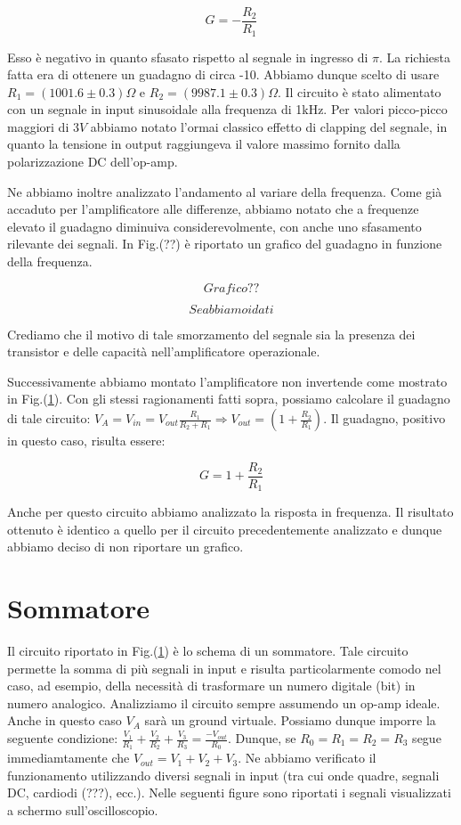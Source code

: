 $$G=-\frac{R_2}{R_1}$$


Esso è negativo in quanto sfasato rispetto al segnale in ingresso di $\pi$.
La richiesta fatta era di ottenere un guadagno di circa -10. Abbiamo dunque scelto di usare $R_1=(1001.6\pm0.3)\Omega$ e $R_2=(9987.1\pm0.3)\Omega$. Il circuito è stato alimentato con un segnale in input sinusoidale alla frequenza di 1kHz. Per valori picco-picco maggiori di $3V$ abbiamo notato l'ormai classico effetto di clapping del segnale, in quanto la tensione in output raggiungeva il valore massimo fornito dalla polarizzazione DC dell'op-amp. 

Ne abbiamo inoltre analizzato l'andamento al variare della frequenza. Come già accaduto per l'amplificatore alle differenze, abbiamo notato che a frequenze elevato il guadagno diminuiva considerevolmente, con anche uno sfasamento rilevante dei segnali. In Fig.(??) è riportato un grafico del guadagno in funzione della frequenza. 

$$Grafico??$$

$$Se abbiamo i dati$$


Crediamo che il motivo di tale smorzamento del segnale sia la presenza dei transistor e delle capacità nell'amplificatore operazionale.


Successivamente abbiamo montato l'amplificatore non invertende come mostrato in Fig.(\ref{}). Con gli stessi ragionamenti fatti sopra, possiamo calcolare il guadagno di tale circuito: $V_A=V_{in}=V_{out}\frac{R_1}{R_2+R_1} \Rightarrow V_{out}=(1+\frac{R_2}{R_1})$. Il guadagno, positivo in questo caso, risulta essere: 

$$G=1+\frac{R_2}{R_1}$$

Anche per questo circuito abbiamo analizzato la risposta in frequenza. Il risultato ottenuto è identico a quello per il circuito precedentemente analizzato e dunque abbiamo deciso di non riportare un grafico.



\section{Sommatore}

Il circuito riportato in Fig.(\ref{}) è lo schema di un sommatore. Tale circuito permette la somma di più segnali in input e risulta particolarmente comodo nel caso, ad esempio, della necessità di trasformare un numero digitale (bit) in numero analogico. Analizziamo il circuito sempre assumendo un op-amp ideale. Anche in questo caso $V_A$ sarà un ground virtuale. Possiamo dunque imporre la seguente condizione: $\frac{V_1}{R_1}+\frac{V_2}{R_2}+\frac{V_3}{R_3}=\frac{-V_{out}}{R_0}$. Dunque, se $R_0=R_1=R_2=R_3$ segue immediamtamente che $V_{out}=V_1+V_2+V_3$. Ne abbiamo verificato il funzionamento utilizzando diversi segnali in input (tra cui onde quadre, segnali DC, cardiodi (???), ecc.). Nelle seguenti figure sono riportati i segnali visualizzati a schermo sull'oscilloscopio.

